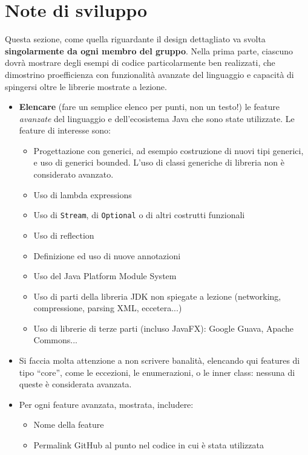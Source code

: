 \documentclass[a4paper,12pt]{report}
\begin{document}
\section{Note di sviluppo}

Questa sezione, come quella riguardante il design dettagliato va svolta \textbf{singolarmente da ogni membro del gruppo}.
%
Nella prima parte, ciascuno dovrà mostrare degli esempi di codice particolarmente ben realizzati,
che dimostrino proefficienza con funzionalità avanzate del linguaggio e capacità di spingersi oltre le librerie mostrate a lezione.

\begin{itemize}
	\item \textbf{Elencare} (fare un semplice elenco per punti, non un testo!) le feature \textit{avanzate} del linguaggio e dell'ecosistema Java che sono state
utilizzate. Le feature di interesse sono:
	\begin{itemize}
		\item Progettazione con generici, ad esempio costruzione di nuovi tipi generici, e uso di generici bounded.
		L'uso di classi generiche di libreria non è considerato avanzato.
		\item Uso di lambda expressions
		\item Uso di \texttt{Stream}, di \texttt{Optional} o di altri costrutti funzionali
		\item Uso di reflection
		\item Definizione ed uso di nuove annotazioni
		\item Uso del Java Platform Module System
		\item Uso di parti della libreria JDK non spiegate a lezione (networking, compressione, parsing XML, eccetera...)
		\item Uso di librerie di terze parti (incluso JavaFX): Google Guava, Apache Commons...
	\end{itemize}
	\item Si faccia molta attenzione a non scrivere banalità, elencando qui features di tipo ``core'', come le eccezioni, le enumerazioni, o le inner class: nessuna di queste è considerata avanzata.
	\item Per ogni feature avanzata, mostrata, includere:
	\begin{itemize}
		\item Nome della feature
		\item Permalink GitHub al punto nel codice in cui è stata utilizzata
	\end{itemize}
\end{itemize}
\end{document}
